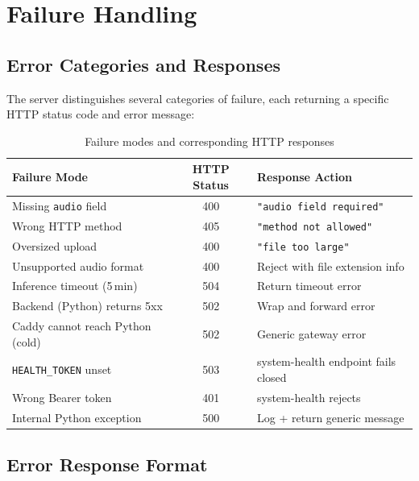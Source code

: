 \chapter{Failure Handling}

\section{Error Categories and Responses}

The server distinguishes several categories of failure, each returning a specific HTTP status code and error message:

\begin{table}[H]
  \centering
  \caption{Failure modes and corresponding HTTP responses}
  \label{tab:failure_modes}
  \renewcommand{\arraystretch}{1.3}
  \begin{tabular}{p{4cm}cp{6cm}}
    \toprule
    \textbf{Failure Mode} & \textbf{HTTP Status} & \textbf{Response Action} \\
    \midrule
    Missing \texttt{audio} field      & 400 & \texttt{"audio field required"} \\
    Wrong HTTP method                 & 405 & \texttt{"method not allowed"} \\
    Oversized upload                  & 400 & \texttt{"file too large"} \\
    Unsupported audio format          & 400 & Reject with file extension info \\
    Inference timeout (5\,min)        & 504 & Return timeout error \\
    Backend (Python) returns 5xx      & 502 & Wrap and forward error \\
    Caddy cannot reach Python (cold) & 502 & Generic gateway error \\
    \texttt{HEALTH\_TOKEN} unset      & 503 & system-health endpoint fails closed \\
    Wrong Bearer token                & 401 & system-health rejects \\
    Internal Python exception         & 500 & Log + return generic message \\
    \bottomrule
  \end{tabular}
\end{table}

\section{Error Response Format}

